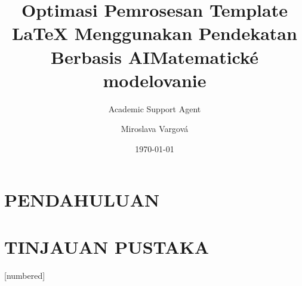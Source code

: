 \documentclass{beamer}
\title{Optimasi Pemrosesan Template LaTeX Menggunakan Pendekatan Berbasis AI}
\author{Academic Support Agent}
\date{\today}
\begin{document}
\maketitle

\begin{abstract}

\end{abstract}

\chapter{PENDAHULUAN}


\chapter{TINJAUAN PUSTAKA}


%
%
%
{
  [numbered]
} 

\usepackage[czech]{babel}
\usepackage[utf8]{inputenc}
\usepackage[T1]{fontenc}
\usepackage{lmodern}

\newtheorem{veta}{Věta}
\newtheorem{lema}[veta]{Lemma}

\title[Ukázková prezentace]{Matematické modelovanie}
\author{Miroslava Vargová}
\end{document}
